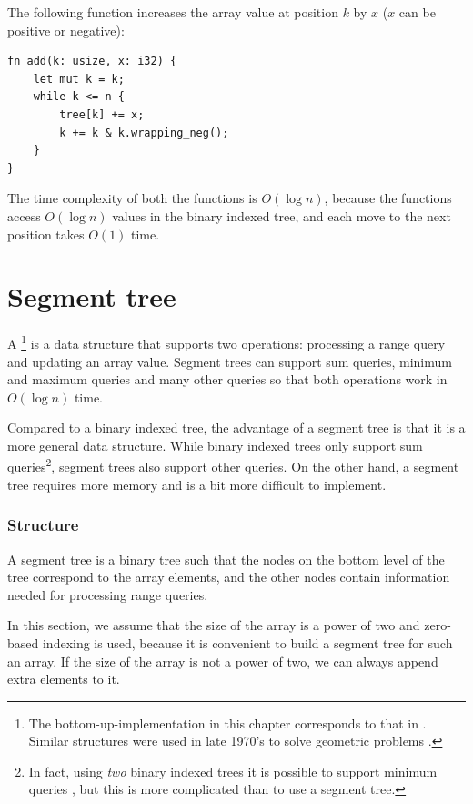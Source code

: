 The following function increases the
array value at position $k$ by $x$
($x$ can be positive or negative):
\begin{lstlisting}
fn add(k: usize, x: i32) {
    let mut k = k;
    while k <= n {
        tree[k] += x;
        k += k & k.wrapping_neg();
    }
}
\end{lstlisting}

The time complexity of both the functions is
$O(\log n)$, because the functions access $O(\log n)$
values in the binary indexed tree, and each move
to the next position takes $O(1)$ time.

\section{Segment tree}


A \footnote{The bottom-up-implementation in this chapter corresponds to
that in \cite{sta06}. Similar structures were used
in late 1970's to solve geometric problems \cite{ben80}.} is a data structure
that supports two operations:
processing a range query and
updating an array value.
Segment trees can support
sum queries, minimum and maximum queries and many other
queries so that both operations work in $O(\log n)$ time.

Compared to a binary indexed tree,
the advantage of a segment tree is that it is
a more general data structure.
While binary indexed trees only support
sum queries\footnote{In fact, using \emph{two} binary
indexed trees it is possible to support minimum queries \cite{dim15},
but this is more complicated than to use a segment tree.},
segment trees also support other queries.
On the other hand, a segment tree requires more
memory and is a bit more difficult to implement.

\subsubsection{Structure}

A segment tree is a binary tree
such that the nodes on the bottom level of the tree
correspond to the array elements,
and the other nodes
contain information needed for processing range queries.

In this section, we assume that the size
of the array is a power of two and zero-based
indexing is used, because it is convenient to build
a segment tree for such an array.
If the size of the array is not a power of two,
we can always append extra elements to it.

